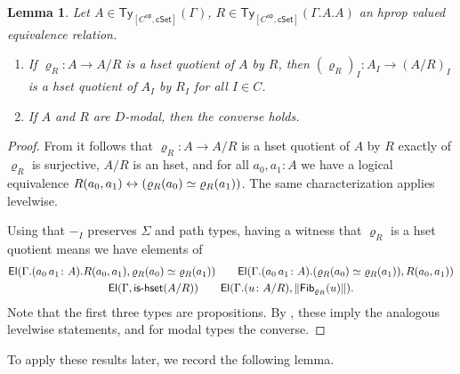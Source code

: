 \documentclass[10pt,a4paper]{article}
\newtheorem{lemma}[theorem]{Lemma}
\theoremstyle{definition}
\theoremstyle{remark}
\newcommand{\cSet}{\mathsf{cSet}}
\DeclareMathOperator\op{\mathsf{op}}
\newcommand\Ty{\mathsf{Ty}}
\newcommand\El{\mathsf{El}}
\DeclarePairedDelimiter\paren{(}{)}
\newcommand\Fib{\mathsf{Fib}}
\begin{document}
\begin{lemma}\label{prop:psh:levelwise-quotient-if-hset-quotient}
  Let \(A \in \Ty_{[C^{\op}, \cSet]}(\Gamma)\), \(R \in \Ty_{[C^{\op}, \cSet]}(\Gamma.A.A)\) an hprop valued equivalence relation.
  \begin{enumerate}[label=(\arabic*)]
    \item If \(\varrho_R \colon A \to A/R\) is a hset quotient of \(A\) by \(R\), then \((\varrho_R)_I \colon A_I \to (A/R)_I\) is a hset quotient of \(A_I\) by \(R_I\) for all \(I \in C\).
    \item\label{prop:psh:levelwise-quotient-if-hset-quotient:modal-converse} If \(A\) and \(R\) are \(D\)-modal, then the converse holds.
  \end{enumerate}
\end{lemma}
\begin{proof}
  From \cite[Theorem 18.2.3]{rijke2025intro} it follows that \(\varrho_R \colon A \to A/R\) is a hset quotient of \(A\) by \(R\) exactly of \(\varrho_R\) is surjective, \(A/R\) is an hset, and for all \(a_0, a_1 \colon A\) we have a logical equivalence \(R(a_0, a_1) \leftrightarrow \paren{\varrho_R(a_0) \simeq \varrho_R(a_1)}\).
  The same characterization applies levelwise.

  Using that \(-_I\) preserves \(\Sigma\) and path types, having a witness that \(\varrho_R\) is a hset quotient means we have elements of
  \begin{gather*}  
    \El(\Gamma.(a_0\,a_1 \colon A).R(a_0, a_1), \varrho_R(a_0) \simeq \varrho_R(a_1))
    \qquad \El(\Gamma.(a_0\,a_1 \colon A).(\varrho_R(a_0) \simeq \varrho_R(a_1)), R(a_0, a_1)) \\
    \El(\Gamma, \textsf{is-hset}(A/R))
    \qquad
    \El(\Gamma.(u \colon A/R), \trunc{\Fib_{\varrho_R}(u)}).
  \end{gather*}
  Note that the first three types are propositions.
  By , these imply the analogous levelwise statements, and for modal types the converse.
\end{proof}
%
To apply these results later, we record the following lemma.
\end{document}
